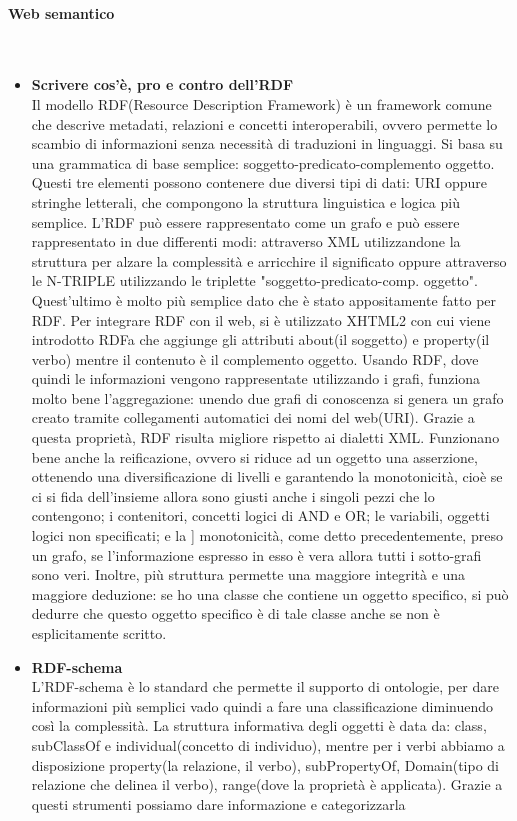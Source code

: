 \documentclass[10pt,                    %
               a4paper,                 %
               twoside,                 %
               openright,               %
               english,                 
               italian,                 
]{article}
\begin{document}
\paragraph{Web semantico} \mbox{}\\
\begin{itemize}
\item \textbf{Scrivere cos'è, pro e contro dell'RDF} \\
Il modello RDF(Resource Description Framework) è un framework comune che 
descrive metadati, relazioni e concetti interoperabili, ovvero permette lo
scambio di informazioni senza necessità di traduzioni in linguaggi. Si basa 
su una grammatica di base semplice: soggetto-predicato-complemento oggetto.
Questi tre elementi possono contenere due diversi tipi di dati: URI oppure 
stringhe letterali, che compongono la struttura linguistica e logica più 
semplice. L'RDF può essere rappresentato come un grafo e può essere 
rappresentato in due differenti modi: attraverso XML utilizzandone la 
struttura per alzare la complessità e arricchire il significato oppure 
attraverso le N-TRIPLE utilizzando le triplette "soggetto-predicato-comp. 
oggetto". Quest'ultimo è molto più semplice dato che è stato appositamente
fatto per RDF. Per integrare RDF con il web, si è utilizzato XHTML2 con cui 
viene introdotto RDFa che aggiunge gli attributi about(il soggetto) e 
property(il verbo) mentre il contenuto è il complemento oggetto.
Usando RDF, dove quindi le informazioni vengono rappresentate utilizzando 
i grafi, funziona molto bene l'aggregazione: unendo due grafi di conoscenza 
si genera un grafo creato tramite collegamenti automatici dei nomi del 
web(URI). Grazie a questa proprietà, RDF risulta migliore rispetto ai 
dialetti XML. Funzionano bene anche la reificazione, ovvero si riduce ad un
oggetto una asserzione, ottenendo una diversificazione di livelli e 
garantendo la monotonicità, cioè se ci si fida dell'insieme allora sono 
giusti anche i singoli pezzi che lo contengono; i contenitori, concetti 
logici di AND e OR; le variabili, oggetti logici non specificati; e la ]
monotonicità, come detto precedentemente, preso un grafo, se l'informazione
espresso in esso è vera allora tutti i sotto-grafi sono veri.
Inoltre, più struttura permette una maggiore integrità e una maggiore 
deduzione: se ho una classe che contiene un oggetto specifico, si può dedurre
che questo oggetto specifico è di tale classe anche se non è esplicitamente 
scritto.

\item \textbf{RDF-schema} \\
L'RDF-schema è lo standard che permette il supporto di ontologie, per dare 
informazioni più semplici vado quindi a fare una classificazione diminuendo 
così la complessità. La struttura informativa degli oggetti è data da: class, 
subClassOf e individual(concetto di individuo), mentre per i verbi abbiamo a 
disposizione property(la relazione, il verbo), subPropertyOf, Domain(tipo di 
relazione che delinea il verbo), range(dove la proprietà è applicata).
Grazie a questi strumenti possiamo dare informazione e categorizzarla 
\end{itemize}
\end{document}
